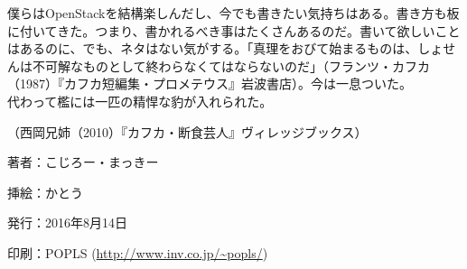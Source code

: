 \documentclass[9pt,b5paper,tombo,openany]{jsbook}
\begin{document}
僕らはOpenStackを結構楽しんだし、今でも書きたい気持ちはある。書き方も板に付いてきた。つまり、書かれるべき事はたくさんあるのだ。書いて欲しいことはあるのに、でも、ネタはない気がする。「真理をおびて始まるものは、しょせんは不可解なものとして終わらなくてはならないのだ」（フランツ・カフカ（1987）『カフカ短編集・プロメテウス』岩波書店）。今は一息ついた。\\

\noindent
代わって檻には一匹の精悍な豹が入れられた。

\noindent
（西岡兄姉（2010）『カフカ・断食芸人』ヴィレッジブックス）

\begin{minipage}{0.5\paperwidth}
	著者：こじろー・まっきー

	挿絵：かとう

	発行：2016年8月14日

	印刷：POPLS (\url{http://www.inv.co.jp/~popls/})
\end{minipage}
\end{document}

